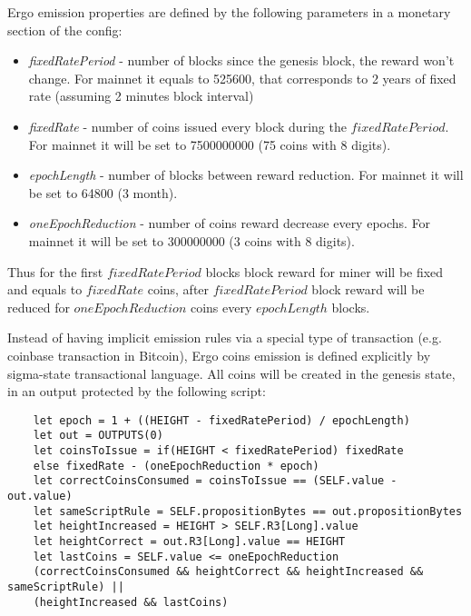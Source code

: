 Ergo emission properties are defined by the following parameters in a monetary section of the config:

\begin{itemize}
    \item{\em fixedRatePeriod } - number of blocks since the genesis block, the reward won't change.
    For mainnet it equals to 525600, that corresponds to 2 years of fixed rate (assuming 2 minutes block interval)
    \item{\em fixedRate } - number of coins issued every block during the $fixedRatePeriod$.
    For mainnet it will be set to 7500000000 (75 coins with 8 digits).
    \item{\em epochLength } - number of blocks between reward reduction.
    For mainnet it will be set to 64800 (3 month).
    \item{\em oneEpochReduction } - number of coins reward decrease every epochs.
    For mainnet it will be set to 300000000 (3 coins with 8 digits).
\end{itemize}

Thus for the first $fixedRatePeriod$ blocks block reward for miner will be fixed and equals to $fixedRate$ \ergo{} coins,
after $fixedRatePeriod$ block reward will be reduced for $oneEpochReduction$ coins every $epochLength$ blocks.

Instead of having implicit emission rules via a special type of transaction (e.g. coinbase transaction in Bitcoin),
Ergo coins emission is defined explicitly by sigma-state transactional language.
All \ergo{} coins will be created in the genesis state, in an output protected by the following script:

\begin{verbatim}
    let epoch = 1 + ((HEIGHT - fixedRatePeriod) / epochLength)
    let out = OUTPUTS(0)
    let coinsToIssue = if(HEIGHT < fixedRatePeriod) fixedRate
    else fixedRate - (oneEpochReduction * epoch)
    let correctCoinsConsumed = coinsToIssue == (SELF.value - out.value)
    let sameScriptRule = SELF.propositionBytes == out.propositionBytes
    let heightIncreased = HEIGHT > SELF.R3[Long].value
    let heightCorrect = out.R3[Long].value == HEIGHT
    let lastCoins = SELF.value <= oneEpochReduction
    (correctCoinsConsumed && heightCorrect && heightIncreased && sameScriptRule) ||
    (heightIncreased && lastCoins)
\end{verbatim}

